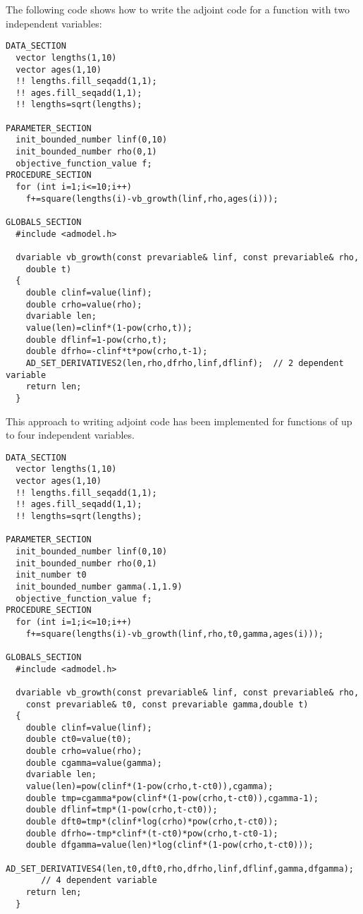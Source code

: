 The following code shows how to write the adjoint code for a function with two
independent variables:
\begin{lstlisting}
DATA_SECTION
  vector lengths(1,10)
  vector ages(1,10)
  !! lengths.fill_seqadd(1,1);
  !! ages.fill_seqadd(1,1);
  !! lengths=sqrt(lengths);

PARAMETER_SECTION
  init_bounded_number linf(0,10) 
  init_bounded_number rho(0,1) 
  objective_function_value f;
PROCEDURE_SECTION
  for (int i=1;i<=10;i++)
    f+=square(lengths(i)-vb_growth(linf,rho,ages(i)));
  
GLOBALS_SECTION
  #include <admodel.h>

  dvariable vb_growth(const prevariable& linf, const prevariable& rho, 
    double t)
  {
    double clinf=value(linf);
    double crho=value(rho);
    dvariable len;
    value(len)=clinf*(1-pow(crho,t));
    double dflinf=1-pow(crho,t);
    double dfrho=-clinf*t*pow(crho,t-1);
    AD_SET_DERIVATIVES2(len,rho,dfrho,linf,dflinf);  // 2 dependent variable 
    return len;
  }
\end{lstlisting}
This approach to writing adjoint code has been implemented for functions of
up to four independent variables.
\begin{lstlisting}
DATA_SECTION
  vector lengths(1,10)
  vector ages(1,10)
  !! lengths.fill_seqadd(1,1);
  !! ages.fill_seqadd(1,1);
  !! lengths=sqrt(lengths);

PARAMETER_SECTION
  init_bounded_number linf(0,10) 
  init_bounded_number rho(0,1) 
  init_number t0 
  init_bounded_number gamma(.1,1.9) 
  objective_function_value f;
PROCEDURE_SECTION
  for (int i=1;i<=10;i++)
    f+=square(lengths(i)-vb_growth(linf,rho,t0,gamma,ages(i)));
  
GLOBALS_SECTION
  #include <admodel.h>

  dvariable vb_growth(const prevariable& linf, const prevariable& rho, 
    const prevariable& t0, const prevariable gamma,double t)
  {
    double clinf=value(linf);
    double ct0=value(t0);
    double crho=value(rho);
    double cgamma=value(gamma);
    dvariable len;
    value(len)=pow(clinf*(1-pow(crho,t-ct0)),cgamma);
    double tmp=cgamma*pow(clinf*(1-pow(crho,t-ct0)),cgamma-1);
    double dflinf=tmp*(1-pow(crho,t-ct0));
    double dft0=tmp*(clinf*log(crho)*pow(crho,t-ct0));
    double dfrho=-tmp*clinf*(t-ct0)*pow(crho,t-ct0-1);
    double dfgamma=value(len)*log(clinf*(1-pow(crho,t-ct0)));
    AD_SET_DERIVATIVES4(len,t0,dft0,rho,dfrho,linf,dflinf,gamma,dfgamma); 
       // 4 dependent variable 
    return len;
  }
\end{lstlisting}


